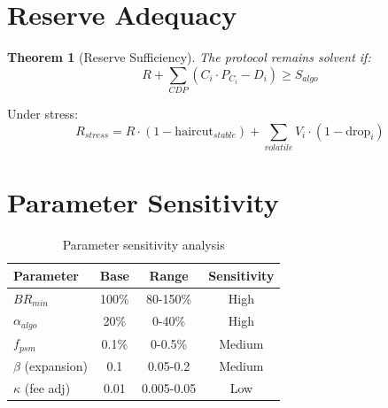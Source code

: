 \documentclass[11pt,a4paper]{article}
\newtheorem{theorem}{Theorem}
\begin{document}
\section{Reserve Adequacy}

\begin{theorem}[Reserve Sufficiency]
The protocol remains solvent if:
\begin{equation}
    R + \sum_{CDP} (C_i \cdot P_{C_i} - D_i) \geq S_{algo}
\end{equation}
\end{theorem}

Under stress:
\begin{equation}
    R_{stress} = R \cdot (1 - \text{haircut}_{stable}) + \sum_{volatile} V_i \cdot (1 - \text{drop}_i)
\end{equation}

\section{Parameter Sensitivity}

\begin{table}[h]
\centering
\begin{tabular}{@{}lccc@{}}
\toprule
Parameter & Base & Range & Sensitivity \\
\midrule
$BR_{min}$ & 100\% & 80-150\% & High \\
$\alpha_{algo}$ & 20\% & 0-40\% & High \\
$f_{psm}$ & 0.1\% & 0-0.5\% & Medium \\
$\beta$ (expansion) & 0.1 & 0.05-0.2 & Medium \\
$\kappa$ (fee adj) & 0.01 & 0.005-0.05 & Low \\
\bottomrule
\end{tabular}
\caption{Parameter sensitivity analysis}
\end{table}
\end{document}
